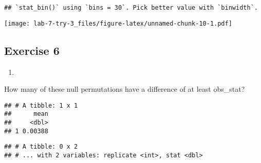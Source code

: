 \documentclass[
]{article}
\newenvironment{Shaded}{\begin{snugshade}}{\end{snugshade}}
\newcommand{\ControlFlowTok}[1]{\textcolor[rgb]{0.13,0.29,0.53}{\textbf{#1}}}
\newcommand{\DataTypeTok}[1]{\textcolor[rgb]{0.13,0.29,0.53}{#1}}
\newcommand{\DecValTok}[1]{\textcolor[rgb]{0.00,0.00,0.81}{#1}}
\newcommand{\KeywordTok}[1]{\textcolor[rgb]{0.13,0.29,0.53}{\textbf{#1}}}
\newcommand{\NormalTok}[1]{#1}
\newcommand{\OperatorTok}[1]{\textcolor[rgb]{0.81,0.36,0.00}{\textbf{#1}}}
\newcommand{\OtherTok}[1]{\textcolor[rgb]{0.56,0.35,0.01}{#1}}
\newcommand{\StringTok}[1]{\textcolor[rgb]{0.31,0.60,0.02}{#1}}
\begin{document}
\begin{verbatim}
## `stat_bin()` using `bins = 30`. Pick better value with `binwidth`.
\end{verbatim}

\texttt{[image: lab-7-try-3\_files/figure-latex/unnamed-chunk-10-1.pdf]}

\hypertarget{exercise-6}{%
\subsection{Exercise 6}\label{exercise-6}}

\begin{enumerate}
\def\labelenumi{\arabic{enumi}.}
\item
\end{enumerate}

How many of these null permutations have a difference of at least
obs\_stat?

\begin{Shaded}
\end{Shaded}

\begin{verbatim}
## # A tibble: 1 x 1
##      mean
##     <dbl>
## 1 0.00388
\end{verbatim}

\begin{Shaded}
\end{Shaded}

\begin{verbatim}
## # A tibble: 0 x 2
## # ... with 2 variables: replicate <int>, stat <dbl>
\end{verbatim}
\end{document}
